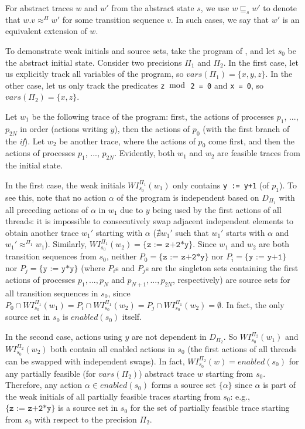 \documentclass[numbook]{svjour3}
\begin{document}
For abstract traces $w$ and $w'$ from the abstract state $s$, we use $w \sqsubseteq_{s} w'$ to denote that $w.v \approx^\Pi w'$ for some transition sequence $v$. In such cases, we say that $w'$ is an equivalent extension of $w$.

\begin{example}
	To demonstrate weak initials and source sets, take the program of , and let $s_0$ be the abstract initial state. Consider two precisions $\Pi_1$ and $\Pi_2$. In the first case, let us explicitly track all variables of the program, so $\mathit{vars}(\Pi_1) = \{x, y, z\}$. In the other case, let us only track the predicates \texttt{z $\bmod$ 2 = 0} and \texttt{x = 0}, so $\mathit{vars}(\Pi_2) = \{x, z\}$.
	
	Let $w_1$ be the following trace of the program: first, the actions of processes $p_1$, ..., $p_{2N}$ in order (actions writing $y$), then the actions of $p_0$ (with the first branch of the \emph{if}). Let $w_2$ be another trace, where the actions of $p_0$ come first, and then the actions of processes $p_1$, ..., $p_{2N}$. Evidently, both $w_1$ and $w_2$ are feasible traces from the initial state.
	
	In the first case, the weak initials $\mathit{WI}_{s_0}^{\Pi_1}(w_1)$ only contains \texttt{y := y+1} (of $p_1$). To see this, note that no action $\alpha$ of the program is independent based on $D_{\Pi_1}$ with all preceding actions of $\alpha$ in $w_1$ due to $y$ being used by the first actions of all threads: it is impossible to consecutively swap adjacent independent elements to obtain another trace $w_1'$ starting with $\alpha$ ($\nexists w_1'$ such that $w_1'$ starts with $\alpha$ and $w_1' \approx^{\Pi_1} w_1$). Similarly, $\mathit{WI}_{s_0}^{\Pi_1}(w_2) = \{\texttt{z := z+2*y}\}$. Since $w_1$ and $w_2$ are both transition sequences from $s_0$, neither $P_0 = \{\texttt{z := z+2*y}\}$ nor $P_i = \{\texttt{y := y+1}\}$ nor $P_j = \{\texttt{y := y*y}\}$ (where $P_i$s and $P_j$s are the singleton sets containing the first actions of processes $p_1, ..., p_{N}$ and $p_{N+1}, ..., p_{2N}$, respectively) are source sets for all transition sequences in $s_0$, since $P_0 \cap \mathit{WI}_{s_0}^{\Pi_1}(w_1) = P_i \cap \mathit{WI}_{s_0}^{\Pi_1}(w_2) = P_j \cap \mathit{WI}_{s_0}^{\Pi_1}(w_2) = \emptyset$. In fact, the only source set in $s_0$ is $\mathit{enabled}(s_0)$ itself.
	
	In the second case, actions using $y$ are not dependent in $D_{\Pi_2}$. So $\mathit{WI}_{s_0}^{\Pi_2}(w_1)$ and  $\mathit{WI}_{s_0}^{\Pi_2}(w_2)$ both contain all enabled actions in $s_0$ (the first actions of all threads can be swapped with independent swaps). In fact, $\mathit{WI}_{s_0}^{\Pi_2}(w) = \mathit{enabled}(s_0)$ for any partially feasible (for $\mathit{vars}(\Pi_2)$) abstract trace $w$ starting from $s_0$. Therefore, any action $\alpha \in \mathit{enabled}(s_0)$ forms a source set $\{\alpha\}$ since $\alpha$ is part of the weak initials of all partially feasible traces starting from $s_0$: e.g., $\{\texttt{z := z+2*y}\}$ is a source set in $s_0$ for the set of partially feasible trace starting from $s_0$ with respect to the precision $\Pi_2$.
\end{example}
\end{document}
